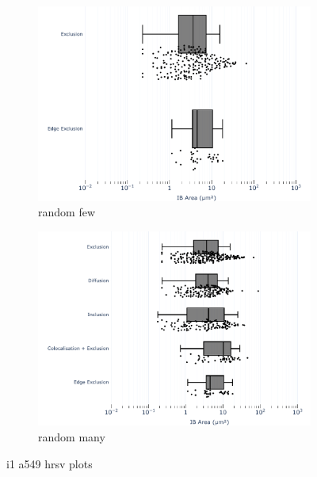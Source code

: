 \begin{figure}
    \begin{subfigure}{0.5\textwidth}
        \includegraphics[width=1\linewidth]{09. Chapter 4/Figs/test-violin-sizerandom-fewsamples.pdf} 
        \caption[]{random few}
    \end{subfigure}
    \begin{subfigure}{0.5\textwidth}
        \includegraphics[width=1\linewidth]{09. Chapter 4/Figs/test-violin-sizerandom-manysamples.pdf}
        \caption[]{random many}
    \end{subfigure}
    \caption[i1 a549 hrsv plots]{i1 a549 hrsv plots}
    \label{fig:i1 a549 hrsv plots}
\end{figure}



